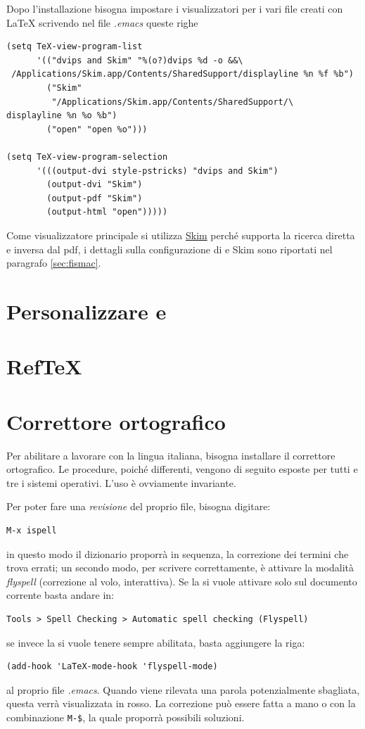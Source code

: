 \documentclass[10pt,a4paper]{article}
\begin{document}
Dopo l'installazione bisogna impostare i visualizzatori per i vari
file creati con \LaTeX{} scrivendo nel file \emph{.emacs} queste righe
\begin{verbatim}
(setq TeX-view-program-list
      '(("dvips and Skim" "%(o?)dvips %d -o &&\
 /Applications/Skim.app/Contents/SharedSupport/displayline %n %f %b")
        ("Skim"
         "/Applications/Skim.app/Contents/SharedSupport/\
displayline %n %o %b")
        ("open" "open %o")))

(setq TeX-view-program-selection 
      '(((output-dvi style-pstricks) "dvips and Skim")
        (output-dvi "Skim")
        (output-pdf "Skim")
        (output-html "open")))))
\end{verbatim}
Come visualizzatore principale si utilizza
\href{http://skim-app.sourceforge.net/}{Skim} perché supporta la
ricerca diretta e inversa dal pdf, i dettagli sulla configurazione di
\emacs e Skim sono riportati nel paragrafo \ref{sec:fismac}.

\section{Personalizzare \emacs{} e \auctex}
\label{sec:personal}

\textcolor{red!50}{\lipsum[1]}

\section{Ref\TeX{}}
\label{sec:reftex}

\textcolor{red!50}{\lipsum[1]}

\section{Correttore ortografico}
\label{sec:corr}
Per abilitare \emacs{} a lavorare con la lingua italiana, bisogna
installare il correttore ortografico. Le procedure, poiché differenti,
vengono di seguito esposte per tutti e tre i sistemi operativi. 
L'uso è ovviamente invariante. 

Per poter fare una \emph{revisione} del proprio file, bisogna digitare:
\begin{Verbatim}
M-x ispell
\end{Verbatim}
in questo modo il dizionario proporrà in sequenza, la correzione
dei termini che trova errati; un secondo modo, per scrivere
correttamente, è attivare la modalità \emph{flyspell} (correzione al
volo, interattiva). Se la si vuole
attivare solo sul documento corrente basta andare in:
\begin{Verbatim}
Tools > Spell Checking > Automatic spell checking (Flyspell)
\end{Verbatim}
se invece la si vuole tenere sempre abilitata,
basta aggiungere la riga:
\begin{Verbatim}
(add-hook 'LaTeX-mode-hook 'flyspell-mode)
\end{Verbatim}
al proprio file \emph{.emacs}. Quando viene rilevata una parola
potenzialmente sbagliata, questa verrà visualizzata in rosso. La
correzione può essere fatta a mano o con la combinazione \verb!M-$!,
la quale proporrà possibili soluzioni.
\end{document}

